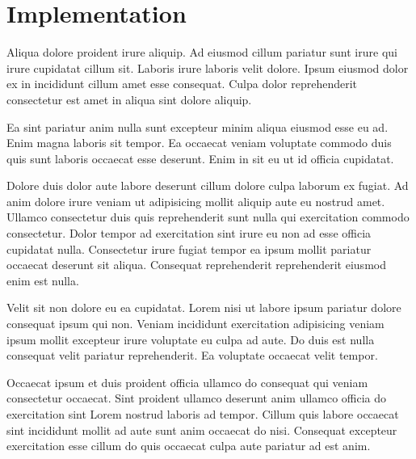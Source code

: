 \section{Implementation}
Aliqua dolore proident irure aliquip. Ad eiusmod cillum pariatur sunt irure qui irure cupidatat cillum sit. Laboris irure laboris velit dolore. Ipsum eiusmod dolor ex in incididunt cillum amet esse consequat. Culpa dolor reprehenderit consectetur est amet in aliqua sint dolore aliquip.

Ea sint pariatur anim nulla sunt excepteur minim aliqua eiusmod esse eu ad. Enim magna laboris sit tempor. Ea occaecat veniam voluptate commodo duis quis sunt laboris occaecat esse deserunt. Enim in sit eu ut id officia cupidatat.

Dolore duis dolor aute labore deserunt cillum dolore culpa laborum ex fugiat. Ad anim dolore irure veniam ut adipisicing mollit aliquip aute eu nostrud amet. Ullamco consectetur duis quis reprehenderit sunt nulla qui exercitation commodo consectetur. Dolor tempor ad exercitation sint irure eu non ad esse officia cupidatat nulla. Consectetur irure fugiat tempor ea ipsum mollit pariatur occaecat deserunt sit aliqua. Consequat reprehenderit reprehenderit eiusmod enim est nulla.

Velit sit non dolore eu ea cupidatat. Lorem nisi ut labore ipsum pariatur dolore consequat ipsum qui non. Veniam incididunt exercitation adipisicing veniam ipsum mollit excepteur irure voluptate eu culpa ad aute. Do duis est nulla consequat velit pariatur reprehenderit. Ea voluptate occaecat velit tempor.

Occaecat ipsum et duis proident officia ullamco do consequat qui veniam consectetur occaecat. Sint proident ullamco deserunt anim ullamco officia do exercitation sint Lorem nostrud laboris ad tempor. Cillum quis labore occaecat sint incididunt mollit ad aute sunt anim occaecat do nisi. Consequat excepteur exercitation esse cillum do quis occaecat culpa aute pariatur ad est anim.